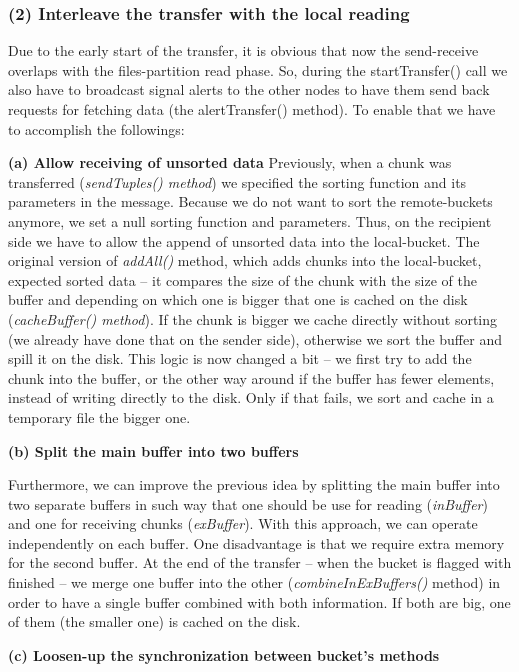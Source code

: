 % 
\subsubsection*{(2) Interleave the transfer with the local reading}

Due to the early start of the transfer, it is obvious that now the send-receive overlaps with the files-partition read phase. So, during the startTransfer() call we also have to broadcast signal alerts to the other nodes to have them send back requests for fetching data (the alertTransfer() method). To enable that we have to accomplish the followings:

\textbf{(a) Allow receiving of unsorted data}
Previously, when a chunk was transferred (\textit{sendTuples() method}) we specified the sorting function and its parameters in the message. Because we do not want to sort the remote-buckets anymore, we set a null sorting function and parameters. Thus, on the recipient side we have to allow the append of unsorted data into the local-bucket. The original version of \textit{addAll()} method, which adds chunks into the local-bucket, expected sorted data -- it compares the size of the chunk with the size of the buffer and depending on which one is bigger that one is cached on the disk (\textit{cacheBuffer() method}). If the chunk is bigger we cache directly without sorting (we already have done that on the sender side), otherwise we sort the buffer and spill it on the disk. This logic is now changed a bit -- we first try to add the chunk into the buffer, or the other way around if the buffer has fewer elements, instead of writing directly to the disk. Only if that fails, we sort and cache in a temporary file the bigger one. 

\textbf{(b) Split the main buffer into two buffers}

Furthermore, we can improve the previous idea by splitting the main buffer into two separate buffers in such way that one should be use for reading (\textit{inBuffer}) and one for receiving chunks (\textit{exBuffer}). With this approach, we can operate independently on each buffer. One disadvantage is that we require extra memory for the second buffer. At the end of the transfer -- when the bucket is flagged with finished -- we merge one buffer into the other (\textit{combineInExBuffers()} method) in order to have a single buffer combined with both information. If both are big, one of them (the smaller one) is cached on the disk.

\textbf{(c) Loosen-up the synchronization between bucket's methods}

